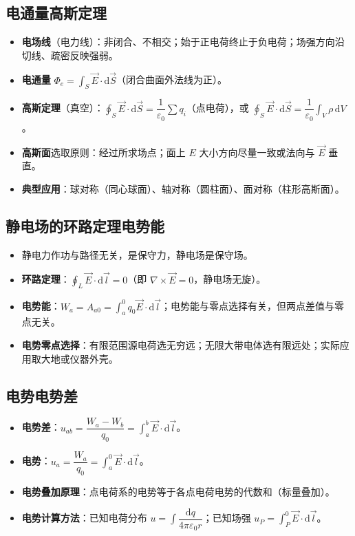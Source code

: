 \documentclass[12pt,a4paper]{ctexart}
\begin{document}
\subsection{电通量\quad 高斯定理}

\begin{itemize}
    \item \textbf{电场线}（电力线）：非闭合、不相交；始于正电荷终止于负电荷；场强方向沿切线、疏密反映强弱。
    \item \textbf{电通量} $\Phi_e=\displaystyle\int_S \vec E\cdot\mathrm d\vec S$（闭合曲面外法线为正）。
    \item \textbf{高斯定理}（真空）：$\displaystyle\oint_S \vec E\cdot\mathrm d\vec S=\dfrac{1}{\varepsilon_0}\sum q_i$（点电荷），或 $\displaystyle\oint_S \vec E\cdot\mathrm d\vec S=\dfrac{1}{\varepsilon_0}\int_V \rho\,\mathrm dV$。
    \item \textbf{高斯面}选取原则：经过所求场点；面上 $E$ 大小方向尽量一致或法向与 $\vec E$ 垂直。
    \item \textbf{典型应用}：球对称（同心球面）、轴对称（圆柱面）、面对称（柱形高斯面）。
\end{itemize}

\subsection{静电场的环路定理\quad 电势能}

\begin{itemize}
    \item 静电力作功与路径无关，是保守力，静电场是保守场。
    \item \textbf{环路定理}：$\displaystyle\oint_L \vec E\cdot\mathrm d\vec l=0$（即 $\nabla\times\vec E=0$，静电场无旋）。
    \item \textbf{电势能}：$W_a=A_{a0}=\displaystyle\int_a^0 q_0\vec E\cdot\mathrm d\vec l$；电势能与零点选择有关，但两点差值与零点无关。
    \item \textbf{电势零点选择}：有限范围源电荷选无穷远；无限大带电体选有限远处；实际应用取大地或仪器外壳。
\end{itemize}

\subsection{电势\quad 电势差}

\begin{itemize}
    \item \textbf{电势差}：$u_{ab}=\dfrac{W_a-W_b}{q_0}=\displaystyle\int_a^b \vec E\cdot\mathrm d\vec l$。
    \item \textbf{电势}：$u_a=\dfrac{W_a}{q_0}=\displaystyle\int_a^0 \vec E\cdot\mathrm d\vec l$。
    \item \textbf{电势叠加原理}：点电荷系的电势等于各点电荷电势的代数和（标量叠加）。
    \item \textbf{电势计算方法}：已知电荷分布 $u=\displaystyle\int\dfrac{\mathrm dq}{4\pi\varepsilon_0 r}$；已知场强 $u_P=\displaystyle\int_P^0 \vec E\cdot\mathrm d\vec l$。
\end{itemize}
\end{document}
